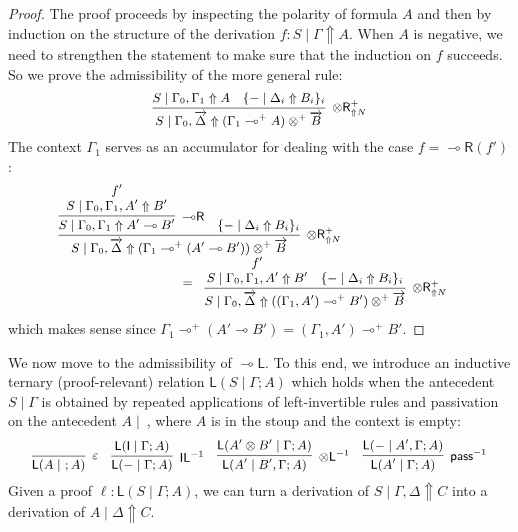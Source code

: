 \documentclass[runningheads]{llncs}
\renewcommand{\vec}{\overrightarrow}
\newcommand{\tl}{\otimes \mathsf{L}}
\newcommand{\tr}{\otimes \mathsf{R}}
\newcommand{\lright}{{\multimap}\mathsf{R}}
\newcommand{\lleft}{{\multimap}\mathsf{L}}
\newcommand{\pass}{\mathsf{pass}}
\newcommand{\unitl}{\mathsf{IL}}
\newcommand{\otL}{\tl}
\newcommand{\otR}{\tr}
\newcommand{\lolliR}{\lright}
\newcommand{\lolliL}{\lleft}
\newcommand{\IL}{\unitl}
\newcommand{\ot}{\otimes}
\newcommand{\lolli}{\multimap}
\newcommand{\I}{\mathsf{I}}
\renewcommand{\L}{\mathsf{L}}
\newcommand{\proofbox}[1]{\begin{tabular}{l} #1 \end{tabular}}
\newcommand{\up}{\Uparrow}
\begin{document}
\begin{proof}
  The proof proceeds by inspecting the polarity of formula $A$ and then by induction on the structure of the derivation $f : S \mid \Gamma \up A$. When $A$ is negative, we need to strengthen the statement to make sure that the induction on $f$ succeeds. So we prove the admissibility of the more general rule:
  \[\small
      \infer[\otR^+_{\up N}]{S \mid \Gamma_0 , \vec{\Delta} \up (\Gamma_1 \lolli^+ A) \ot^+ \vec{B}}{
      S \mid \Gamma_0,\Gamma_1 \up A
      &
      \{ - \mid \Delta_i \up B_i \}_{i}
      }
\]
  The context $\Gamma_1$ serves as an accumulator for dealing with the case $f = \lolliR(f')$:
  \begin{equation}\label{eq:otRlolliR}
  \footnotesize
  \begin{array}{c}
   \hspace{-3cm} \infer[\otR^+_{\up N}]{S \mid \Gamma_0 , \vec{\Delta} \up (\Gamma_1 \lolli^+ (A' \lolli B')) \ot^+ \vec{B}}{
      \infer[\lolliR]{S \mid \Gamma_0,\Gamma_1\up A' \lolli B'}{
        \deduce{S \mid \Gamma_0,\Gamma_1,A'\up B'}{f'}
        }
      &
      \{ - \mid \Delta_i \up B_i \}_{i}
    }
    \\
   \hspace{3cm} =
    \proofbox{
    \infer[\otR^+_{\up N}]{S \mid \Gamma_0 , \vec{\Delta} \up ((\Gamma_1,A') \lolli^+ B') \ot^+ \vec{B}}{
      \deduce{S \mid \Gamma_0,\Gamma_1,A' \up B'}{f'}
      &
      \{ - \mid \Delta_i \up B_i \}_{i}
    }}
  \end{array}
  \end{equation}
  which makes sense since $\Gamma_1 \lolli^+ (A' \lolli B') = (\Gamma_1,A') \lolli^+ B'$.
\end{proof}
We now move to the admissibility of $\lolliL$. To this end, we introduce an inductive ternary (proof-relevant) relation $\L(S\mid\Gamma;A)$ which holds when the antecedent $S\mid \Gamma$ is obtained by repeated applications of left-invertible rules and passivation on the antecedent $A \mid ~$, where $A$ is in the stoup and the context is empty:
\begin{equation*}\small
  \infer[\varepsilon]{\L(A\mid ~ ;A)}{}
  \quad
  \infer[\IL^{-1}]{\L(-\mid\Gamma;A)}{\L(\I\mid\Gamma;A)}
  \quad
  \infer[\otL^{-1}]{\L(A'\mid B',\Gamma;A)}{\L(A' \ot B'\mid \Gamma;A)}
  \quad
  \infer[\pass^{-1}]{\L(A' \mid\Gamma;A)}{\L(-\mid A',\Gamma;A)}
\end{equation*}
Given a proof $\ell : \L(S\mid\Gamma;A)$, we can turn a derivation of $S \mid \Gamma,\Delta \up C$ into a derivation of $A \mid \Delta \up C$.
\end{document}
